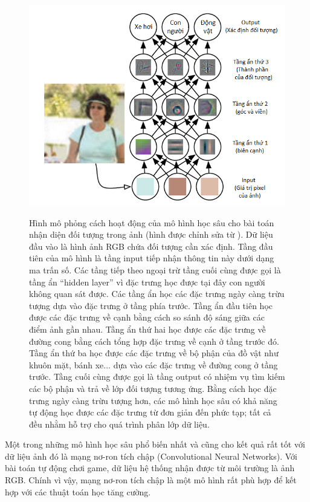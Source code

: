 	\begin{figure}
		\centering
		\includegraphics[width=\textwidth]{deep_learning_example}
		\label{fig_dl_Example}
		\caption[Hình mô phỏng cách hoạt động của mô hình học sâu]{Hình mô phỏng cách hoạt động của mô hình học sâu cho bài toán nhận diện đối tượng trong ảnh (hình được chỉnh sửa từ \cite{Goodfellow-et-al-2016-Book}).
		Dữ liệu đầu vào là hình ảnh RGB chứa đối tượng cần xác định. Tầng đầu tiên của mô hình là tầng input tiếp nhận thông tin này dưới dạng ma trấn số. 
		Các tầng tiếp theo ngoại trừ tầng cuối cùng được gọi là tầng ẩn ``hidden layer'' vì đặc trưng học được tại đây con người không quan sát được. 
		Các tầng ẩn học các đặc trưng ngày càng trừu tượng dựa vào đặc trưng ở tầng phía trước. 
		Tầng ẩn đầu tiên học được các đặc trưng về cạnh bằng cách so sánh độ sáng giữa các điểm ảnh gần nhau. 
		Tầng ẩn thứ hai học được các đặc trưng về đường cong bằng cách tổng hợp đặc trưng về cạnh ở tầng trước đó. 
		Tầng ẩn thứ ba học được các đặc trưng về bộ phận của đồ vật như khuôn mặt, bánh xe... dựa vào các đặc trưng về đường cong ở tầng trước. 
		Tầng cuối cùng được gọi là tầng output có nhiệm vụ tìm kiếm các bộ phận và trả về lớp đối tượng tương ứng. 
		Bằng cách học đặc trưng ngày càng trừu tượng hơn, các mô hình học sâu có khả năng tự động học được các đặc trưng từ đơn giản đến phức tạp; tất cả đều nhằm hỗ trợ cho quá trình phân lớp dữ liệu.}
	\end{figure}
	
	Một trong những mô hình học sâu phổ biến nhất và cũng cho kết quả rất tốt với dữ liệu ảnh \cite{lecun2015deep} đó là mạng nơ-ron tích chập (Convolutional Neural Networks).
	Với bài toán tự động chơi game, dữ liệu hệ thống nhận được từ môi trường là ảnh RGB.
	Chính vì vậy, mạng nơ-ron tích chập là một mô hình rất phù hợp để kết hợp với các thuật toán học tăng cường.
	
